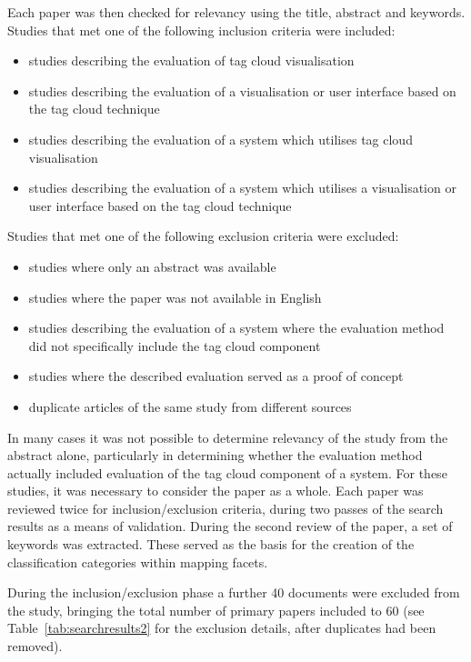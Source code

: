 Each paper was then checked for relevancy using the title, abstract and keywords. Studies that met one of the following inclusion criteria were included: 

\begin{itemize}
\item studies describing the evaluation of tag cloud visualisation
\item studies describing the evaluation of a visualisation or user interface based on the tag cloud technique
\item studies describing the evaluation of a system which utilises tag cloud visualisation 
\item studies describing the evaluation of a system which utilises a visualisation or user interface based on the tag cloud technique
\end{itemize}

Studies that met one of the following exclusion criteria were excluded:

\begin{itemize}
\item studies where only an abstract was available
\item studies where the paper was not available in English
\item studies describing the evaluation of a system where the evaluation method did not specifically include the tag cloud component
\item studies where the described evaluation served as a proof of concept
\item duplicate articles of the same study from different sources
\end{itemize}

In many cases it was not possible to determine relevancy of the study from the abstract alone, particularly in determining whether the evaluation method actually included evaluation of the tag cloud component of a system. For these studies, it was necessary to consider the paper as a whole. Each paper was reviewed twice for inclusion/exclusion criteria, during two passes of the search results as a means of validation. During the second review of the paper, a set of keywords was extracted. These served as the basis for the creation of the classification categories within mapping facets.

During the inclusion/exclusion phase a further 40 documents were excluded from the study, bringing the total number of primary papers included to 60 (see Table~\vref{tab:searchresults2} for the exclusion details, after duplicates had been removed).

